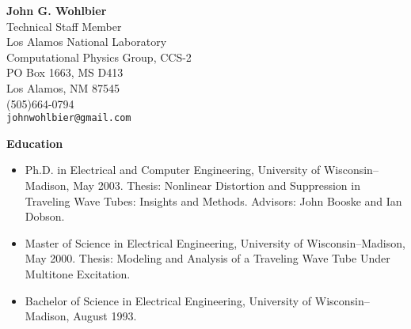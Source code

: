 \documentclass[12pt]{article}
\begin{document}
\begin{center}
  \textbf{John G. Wohlbier}\\
    Technical Staff Member\\
    Los Alamos National Laboratory\\
    Computational Physics Group, CCS-2\\
  PO Box 1663, MS D413\\
  Los Alamos, NM 87545\\
  (505)664-0794\\
  {\tt johnwohlbier@gmail.com}
\end{center}

\noindent\textbf{Education}
\begin{itemize}
\item Ph.D. in Electrical and Computer Engineering, University
  of Wisconsin--Madison, May 2003.
  Thesis: Nonlinear Distortion and Suppression in Traveling Wave
  Tubes: Insights and Methods. Advisors: John Booske and Ian Dobson.
\item Master of Science in Electrical Engineering,
  University of Wisconsin--Madison, May 2000.
  Thesis: Modeling and Analysis of a Traveling Wave Tube Under Multitone
  Excitation.
\item Bachelor of Science in Electrical Engineering,
  University of Wisconsin--Madison, August 1993.
\end{itemize}
\end{document}
